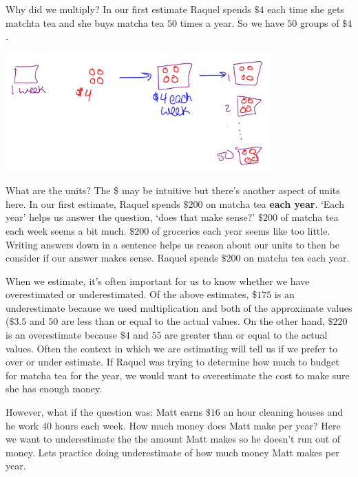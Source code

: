 \documentclass{ximera}
\begin{document}
Why did we multiply? In our first estimate Raquel spends $\$4$ each time she gets matchta tea and she buys matcha tea $50$ times a year.  So we have $50$ groups of $\$4$.

\begin{image}
    \includegraphics[width=4in]{dollarperyear.png}
\end{image}

What are the units? The \$ may be intuitive but there's another aspect of units here. In our first estimate, Raquel spends $\$200$ on matcha tea \textbf{each year}. `Each year' helps us answer the question, `does that make sense?' $\$200$ of matcha tea each week seems a bit much. $\$200$ of groceries each year seems like too little. Writing answers down in a sentence helps us reason about our units to then be consider if our answer makes sense. Raquel spends $\$200$ on matcha tea each year.

When we estimate, it's often important for us to know whether we have overestimated or underestimated.  Of the above estimates, \$$175$ is an underestimate because we used multiplication and both of the approximate values ($\$3.5$ and $50$ are less than or equal to the actual values.  On the other hand, $\$220$ is an overestimate because $\$4$ and $55$ are greater than or equal to the actual values. Often the context in which we are estimating will tell us if we prefer to over or under estimate.  If Raquel was trying to determine how much to budget for matcha tea for the year, we would want to overestimate the cost to make sure she has enough money.  

However, what if the question was: Matt earns $\$16$ an hour cleaning houses and he work $40$ hours each week. How much money does Matt make per year? Here we want to underestimate the the amount Matt makes so he doesn't run out of money. Lets practice doing underestimate of how much money Matt makes per year.
\end{document}
